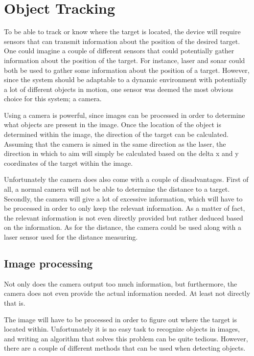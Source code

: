 \section{Object Tracking}
\label{sec:obj_tracking}
To be able to track or know where the target is located, the device will require sensors that can transmit information about the position of the desired target.
One could imagine a couple of different sensors that could potentially gather information about the position of the target.
For instance, laser and sonar could both be used to gather some information about the position of a target\cite{Sensors}.
However, since the system should be adaptable to a dynamic environment with potentially a lot of different objects in motion, one sensor was deemed the most obvious choice for this system; a camera.

Using a camera is powerful, since images can be processed in order to determine what objects are present in the image.
Once the location of the object is determined within the image, the direction of the target can be calculated.
Assuming that the camera is aimed in the same direction as the laser, the direction in which to aim will simply be calculated based on the delta x and y coordinates of the target within the image.

Unfortunately the camera does also come with a couple of disadvantages.
First of all, a normal camera will not be able to determine the distance to a target.
Secondly, the camera will give a lot of excessive information, which will have to be processed in order to only keep the relevant information. 
As a matter of fact, the relevant information is not even directly provided but rather deduced based on the information.
As for the distance, the camera could be used along with a laser sensor used for the distance measuring\cite{Sensors}.

\subsection{Image processing}
Not only does the camera output too much information, but furthermore, the camera does not even provide the actual information needed.
At least not directly that is.

The image will have to be processed in order to figure out where the target is located within.
Unfortunately it is no easy task to recognize objects in images, and writing an algorithm that solves this problem can be quite tedious.
However, there are a couple of different methods that can be used when detecting objects.

